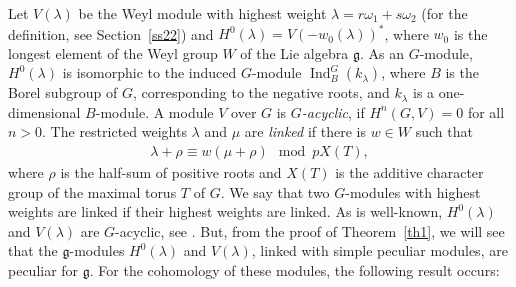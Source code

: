 \documentclass[10pt,a4paper]{amsart}
\numberwithin{equation}{section}
\begin{document}
Let $V(\lambda)$ be the Weyl module with highest weight $\lambda=r\omega_1+s\omega_2$ (for the definition, see Section~\ref{ss22}) and $H^0(\lambda)=V(-w_0(\lambda))^*$, where $w_0$ is the longest element of the Weyl group $W$ of the Lie algebra $\mathfrak{g}$. As an $G$-module, $H^0(\lambda)$ is isomorphic to the induced $G$-module $\operatorname{Ind}_B^{G}(k_{\lambda})$, where $B$ is the Borel subgroup of $G$, corresponding to the negative roots, and $k_{\lambda}$ is a one-dimensional $B$-module. A module $V$ over $G$ is {\it $G$-acyclic}, if $H^n(G,V)=0$ for all $n>0$. The restricted weights $\lambda$ and $\mu$ are {\it linked} if there is $w\in W$ such that
\begin{gather*}
\lambda+\rho\equiv w(\mu+\rho)\mod pX(T),
\end{gather*}
where $\rho$ is the half-sum of positive roots and $X(T)$ is the additive character group of the maximal torus $T$ of $G$. We say that two $G$-modules with highest weights are linked if their highest weights are linked.
As is well-known, $H^0(\lambda)$ and $V(\lambda)$ are $G$-acyclic, see \cite[Corollary~3.4]{CPSK77}. But, from the proof of Theorem~\ref{th1}, we will see that the $\mathfrak{g}$-modules $H^0(\lambda)$ and $V(\lambda)$, linked with simple peculiar modules, are peculiar for $\mathfrak{g}$. For the cohomology of these modules, the following result occurs:
\end{document}

